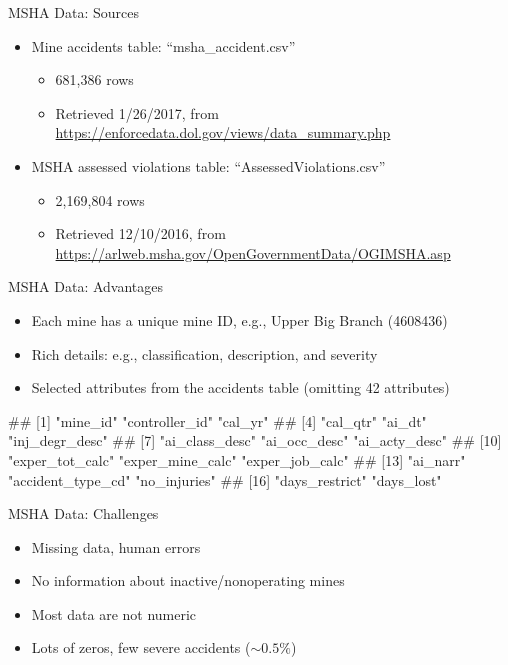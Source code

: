 \documentclass[
]{beamer}
\providecommand{\tightlist}{%
  \setlength{\itemsep}{0pt}\setlength{\parskip}{0pt}}
\let\oldverbatim\verbatim
\let\endoldverbatim\endverbatim
\renewenvironment{verbatim}{\footnotesize\oldverbatim}{\endoldverbatim}
\begin{document}
\begin{frame}{MSHA Data: Sources}

\begin{itemize}
\tightlist
\item
  Mine accidents table: ``msha\_accident.csv''

  \begin{itemize}
  \tightlist
  \item
    681,386 rows
  \item
    Retrieved 1/26/2017, from
    \url{https://enforcedata.dol.gov/views/data_summary.php}
  \end{itemize}
\item
  MSHA assessed violations table: ``AssessedViolations.csv''

  \begin{itemize}
  \tightlist
  \item
    2,169,804 rows
  \item
    Retrieved 12/10/2016, from
    \url{https://arlweb.msha.gov/OpenGovernmentData/OGIMSHA.asp}
  \end{itemize}
\end{itemize}

\end{frame}

\begin{frame}[fragile]{MSHA Data: Advantages}

\begin{itemize}
\tightlist
\item
  Each mine has a unique mine ID, e.g., Upper Big Branch (4608436)
\item
  Rich details: e.g., classification, description, and severity
\item
  Selected attributes from the accidents table (omitting 42 attributes)
\end{itemize}

\begin{verbatim}
##  [1] "mine_id"          "controller_id"    "cal_yr"          
##  [4] "cal_qtr"          "ai_dt"            "inj_degr_desc"   
##  [7] "ai_class_desc"    "ai_occ_desc"      "ai_acty_desc"    
## [10] "exper_tot_calc"   "exper_mine_calc"  "exper_job_calc"  
## [13] "ai_narr"          "accident_type_cd" "no_injuries"     
## [16] "days_restrict"    "days_lost"
\end{verbatim}

\end{frame}

\begin{frame}{MSHA Data: Challenges}

\begin{itemize}
\tightlist
\item
  Missing data, human errors
\item
  No information about inactive/nonoperating mines
\item
  Most data are not numeric
\item
  Lots of zeros, few severe accidents (\(\sim0.5\%\))
\end{itemize}

\end{frame}
\end{document}
